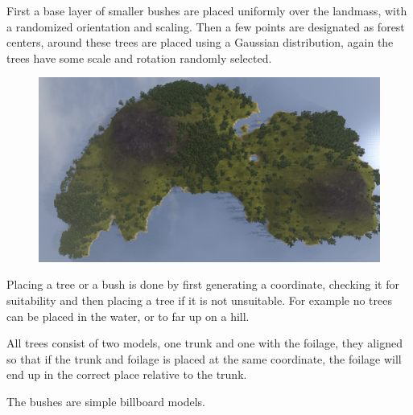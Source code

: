First a base layer of smaller bushes are placed uniformly over the landmass, with a randomized orientation and scaling. Then a few points are designated as forest centers, around these trees are placed using a Gaussian distribution, again the trees have some scale and rotation randomly selected.
\begin{figure}[H]
  \centering
  \includegraphics[width=0.9\linewidth]{images/forestfromthetop.jpg}
\end{figure}

Placing a tree or a bush is done by first generating a coordinate, checking it for suitability and then placing a tree if it is not unsuitable.
For example no trees can be placed in the water, or to far up on a hill.

All trees consist of two models, one trunk and one with the foilage, they aligned so that if the trunk and foilage is placed at the same coordinate, the foilage will end up in the correct place relative to the trunk.

The bushes are simple billboard models.

